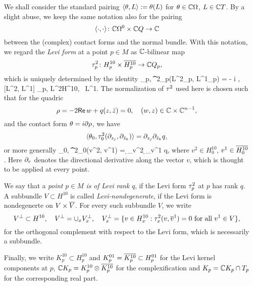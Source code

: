 \documentclass[12pt]{amsart}
\begin{document}
We shall consider the standard pairing $\langle \theta, L\rangle := \theta(L)$
for $\theta\in {\mathbb{C}}\Omega$, $L\in {\mathbb{C}} T$.
By a slight abuse, we keep the same notation also for the pairing
$$
	\langle \cdot, \cdot \rangle \colon {\mathbb{C}}\Omega^0 \times {\mathbb{C}} Q \to {\mathbb{C}}
$$
between the (complex) contact forms and the normal bundle.
With this notation, we regard the {\em Levi form} at a point $p\in M$ 
as  ${\mathbb{C}}$-bilinear map
$$
	\tau^2_p \colon H^{10}_p \times \overline{H^{10}_p} \to {\mathbb{C}} Q_p,
$$
which
is uniquely determined by the identity
\beq{}
	\la \th_p, \t^2_p(L^2_p, L^1_p) \ra = - i \la \th, [L^2, L^1] \ra_p,
	\quad 
	L^2\in H^{10}, \, L^1\in {}.
\eeq
The normalization of $\tau^2$ used here is chosen
such that for the quadric
$$
	\rho = -2{\sf Re}\, w + q(z,{\bar z}) =0,
	\quad
	(w,z)\in {\mathbb{C}}\times {\mathbb{C}}^{n-1},
$$ 
and the contact form $\theta = i\partial \rho$,
we have
$$
	\langle \theta_0,  \tau^2_0(\partial_{z_j}, \partial_{{\bar z}_k}) \rangle = \partial_{z_j} \partial_{{\bar z}_k} q,
$$
or more generally
\beq{}
	\la \th_0,  \t^2_0(v^2, v^1) \ra = \d_{v^2} \d_{v^1} q,
\eeq
where $v^2 \in H^{10}_0$, $v^1\in \overline{H^{10}_0}$.
Here $\partial_v$ denotes the directional derivative 
along the vector $v$, which is thought to be applied at every point.


We say that a {\em point $p\in M$ is of Levi rank $q$},
if the Levi form $\tau^2_p$ at $p$ has rank $q$.
A subbundle $V\subset H^{10}$
is called {\em Levi-nondegenerate},
if the Levi form is nondegenerte on $V\times \overline{V}$. 
For every such subbundle $V$,
we write 
$$
	V^\perp \subset H^{10},
	\quad
	V^\perp = \cup_x V_x^\perp,
	\quad
	V_x^\perp = \{ v\in H^{10}_x : \tau^2_x(v, \overline{v}^1) =0 \text{ for all } v^1\in V\},
$$
for the orthogonal complement with respect to the Levi form,
which is necessarily a subbundle.

Finally, we write $K^{10}_p\subset H^{10}_p$
and $K^{01}_p = \overline{K^{10}_p}\subset H^{01}_p$
for the Levi kernel components at $p$, 
${\mathbb{C}} K_p= K^{10}_p \otimes \overline{K^{10}_p}$
for the complexification and
$K_p = {\mathbb{C}} K_p \cap T_p$
for the corresponding real part.
\end{document}
